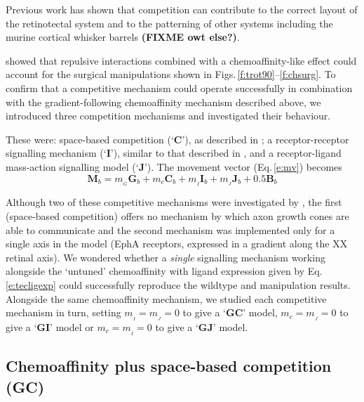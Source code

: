 \documentclass[11pt, a4paper]{article}
\begin{document}
Previous work has shown that competition can contribute to the correct layout
of the retinotectal system \citep{stuff} and to the patterning of other
systems including the murine cortical whisker
barrels \citep{james_modelling_2020} \textbf{(FIXME owt else?)}.

\citet{simpson_simple_2011} showed that repulsive interactions combined with a
chemoaffinity-like effect could account for the surgical manipulations shown
in Figs.\,\ref{f:trot90}--\ref{f:chsurg}. To confirm that a competitive
mechanism could operate successfully in combination with the
gradient-following chemoaffinity mechanism described above, we introduced
three competition mechanisms and investigated their behaviour.

These were: space-based competition (`$\mathbf{C}$'), as described
in \citet{simpson_simple_2011}; a receptor-receptor signalling mechanism
(`$\mathbf{I}$'), similar to that described in \citet{simpson_simple_2011},
and a receptor-ligand mass-action signalling model
(`$\mathbf{J}$'). The movement vector (Eq.\,\ref{e:mv}) becomes
%
\begin{equation} \label{e:mv2}
\mathbf{M}_{b} = m_{\!_G} \mathbf{G}_b +  m_c \mathbf{C}_b +  m_{\!_I} \mathbf{I}_b +  m_{\!_J} \mathbf{J}_b + 0.5 \mathbf{B}_b
\end{equation}
%

Although two of these competitive mechanisms were investigated
by \citet{simpson_simple_2011}, the first (space-based competition) offers no
mechanism by which axon growth cones are able to communicate and the second
mechanism was implemented only for a single axis in the model (EphA receptors,
expressed in a gradient along the XX retinal axis). We wondered whether a
\emph{single} signalling mechanism working alongside the `untuned'
chemoaffinity with ligand expression given by Eq.\,\ref{e:tecligexp} could
successfully reproduce the wildtype and manipulation results. Alongside the
same chemoaffinity mechanism, we studied each competitive mechanism in turn,
setting $m_{\!_I}=m_{\!_J}=0$ to give a `$\mathbf{GC}$' model,
$m_c=m_{\!_J}=0$ to give a `$\mathbf{GI}$' model or $m_c=m_{\!_I}=0$ to give a
`$\mathbf{GJ}$' model.

\subsection*{Chemoaffinity plus space-based competition (GC)}
\end{document}
